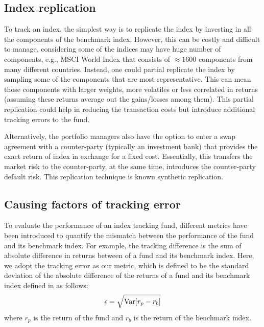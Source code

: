 \subsection{Index replication}
\label{sec:replication}
To track an index, the simplest way is to replicate the index by investing in all the components of the benchmark index. However, this can be costly and difficult to manage, considering some of the indices may have huge number of components, e.g., MSCI World Index that consists of $\approx 1600$ components from many different countries. Instead, one could partial replicate the index by sampling some of the components that are most representative. This can mean those components with larger weights, more volatiles or less correlated in returns (assuming these returns average out the gains/losses among them). This partial replication could help in reducing the transaction costs but introduce additional tracking errors to the fund.

Alternatively, the portfolio managers also have the option to enter a swap agreement with a counter-party (typically an investment bank) that provides the exact return of index in exchange for a fixed cost. Essentially, this transfers the market risk to the counter-party, at the same time, introduces the counter-party default risk. This replication technique is known synthetic replication.
 
\subsection{Causing factors of tracking error}
To evaluate the performance of an index tracking fund, different metrics have been introduced to quantify the mismatch between the performance of the fund and its benchmark index. For example, the tracking difference is the sum of absolute difference in returns between of a fund and its benchmark index. Here, we adopt the tracking error as our metric, which is defined to be the standard deviation of the absolute difference of the returns of a fund and its benchmark index defined in \cite{BJ13} as follows:
\begin{equation}
  \epsilon = \sqrt{\operatorname{{\mathrm{Var}}}[r_p - r_b]}
\end{equation}
where $r_p$ is the return of the fund and $r_b$ is the return of the benchmark index.
 

